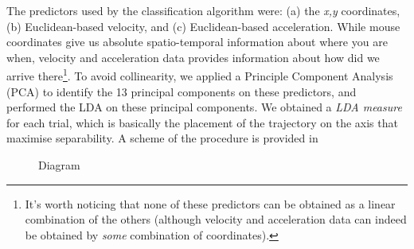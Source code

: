 \documentclass{article}
\begin{document}
The predictors used by the classification algorithm were: (a) the \textit{x,y} coordinates, (b) Euclidean-based velocity, and (c) Euclidean-based acceleration. While mouse coordinates give us absolute spatio-temporal information about where you are when, velocity and acceleration data provides information about how did we arrive there\footnote{It's worth noticing that none of these predictors can be obtained as a linear combination of the others (although velocity and acceleration data can indeed be obtained by \emph{some} combination of coordinates).}.   
To avoid collinearity, we applied a Principle Component Analysis (PCA) to identify the 13 principal components on these predictors, and performed the LDA on these principal components. 
We obtained a \emph{LDA measure} for each trial, which is basically the placement of the trajectory on the axis that maximise separability. 
A scheme of the procedure is provided in 

\begin{figure}

\caption{Diagram}\label{fig:diagram}
\end{figure}
\end{document}
